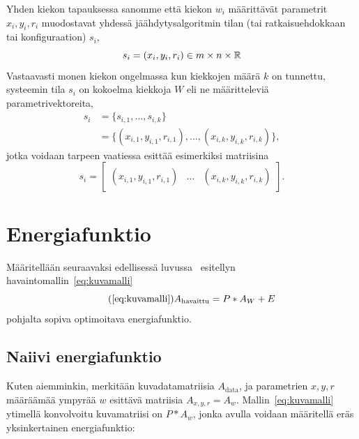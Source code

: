 \begin{maar}
    Yhden kiekon tapauksessa sanomme että kiekon $w_i$ määrittävät parametrit $x_i, y_i, r_i$ muodostavat yhdessä jäähdytysalgoritmin tilan (tai ratkaisuehdokkaan tai konfiguraation) $s_i$,
    \begin{equation}
        s_i = (x_i, y_i, r_i) \in m \times n \times \mathbb{R}
    \end{equation}
    Vastaavasti monen kiekon ongelmassa kun kiekkojen määrä $k$ on tunnettu, systeemin tila $s_i$ on kokoelma kiekkoja $W$ eli ne määritteleviä parametrivektoreita,
    \begin{align}
        \label{eq:tila_monta_kiekkoa}
        s_i &= \{s_{i, 1}, \dots, s_{i, k}\} \\
            &= \{(x_{i,1}, y_{i,1}, r_{i,1}), \dots, (x_{i,k}, y_{i,k}, r_{i,k})\},
    \end{align}
    jotka voidaan tarpeen vaatiessa esittää esimerkiksi matriisina
    \begin{equation}
        s_i =
        \begin{bmatrix}
            (x_{i,1}, y_{i,1}, r_{i,1}) & \dots & (x_{i,k}, y_{i,k}, r_{i,k})
        \end{bmatrix}.
    \end{equation}
\end{maar}

\section{Energiafunktio}
\label{sec:energiafunktio}

Määritellään seuraavaksi edellisessä luvussa~ esitellyn havaintomallin~\eqref{eq:kuvamalli}
\begin{equation*}
    \tag{\ref{eq:kuvamalli}}
    A_\text{havaittu} = P \ast A_W + E
\end{equation*}
pohjalta sopiva optimoitava energiafunktio.

\subsection{Naiivi energiafunktio}
\label{sub:naiivi_energiafunktio}

Kuten aiemminkin, merkitään kuvadatamatriisia $A_{\text{data}}$, ja parametrien $x, y, r$ määräämää ympyrää $w$ esittävä matriisia $A_{x, y, r} = A_w$.
Mallin~\eqref{eq:kuvamalli} ytimellä konvolvoitu kuvamatriisi on $P \ast A_w$,
jonka avulla voidaan määritellä eräs yksinkertainen energiafunktio:

